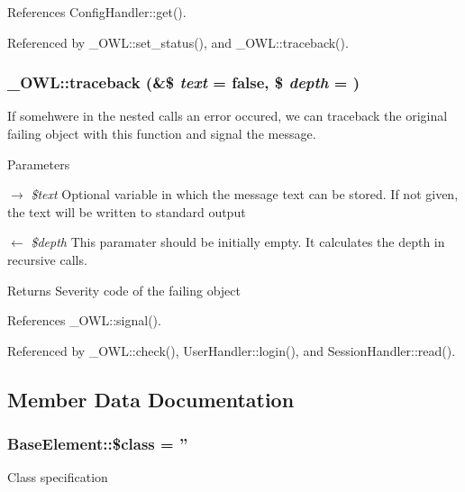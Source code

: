 References ConfigHandler::get().



Referenced by \_\-OWL::set\_\-status(), and \_\-OWL::traceback().

\subsubsection[{traceback}]{\setlength{\rightskip}{0pt plus 5cm}\_\-OWL::traceback (\&\$ {\em text} = {\ttfamily false}, \/  \$ {\em depth} = {})}\label{class__OWL_aa29547995d6741b7d2b90c1d4ea99a13}
If somehwere in the nested calls an error occured, we can traceback the original failing object with this function and signal the message.


\begin{DoxyParams}{Parameters}
\item[\mbox{$\rightarrow$} {\em \$text}]Optional variable in which the message text can be stored. If not given, the text will be written to standard output \item[\mbox{$\leftarrow$} {\em \$depth}]This paramater should be initially empty. It calculates the depth in recursive calls. \end{DoxyParams}
\begin{DoxyReturn}{Returns}
Severity code of the failing object 
\end{DoxyReturn}


References \_\-OWL::signal().



Referenced by \_\-OWL::check(), UserHandler::login(), and SessionHandler::read().



\subsection{Member Data Documentation}
\subsubsection[{\$class}]{\setlength{\rightskip}{0pt plus 5cm}BaseElement::\$class = ''}\label{classBaseElement_a99976a8e967db92e7800309f359b0803}
Class specification 
